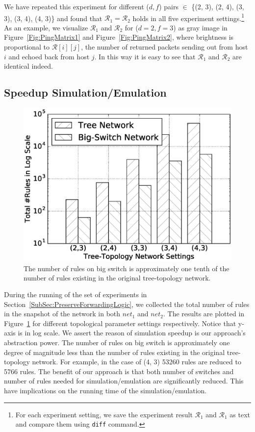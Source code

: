 We have repeated this experiment for different ($d, f$) pairs $\in$
\{(2, 3), (2, 4), (3, 3), (3, 4), (4, 3)\} and found that
$\mathcal{R}_1 = \mathcal{R}_2$ holds in all five experiment settings.\footnote{For each
experiment setting, we save the experiment result $\mathcal{R}_1$ and $\mathcal{R}_1$
as text and compare them using \texttt{diff} command.}
As an example, we visualize $\mathcal{R}_1$ and $\mathcal{R}_2$ for ($d=2, f=3$) as gray image
in Figure~\ref{Fig:PingMatrix1} and Figure~\ref{Fig:PingMatrix2},
where brightness is proportional to $\mathcal{R}[i][j]$,
the number of returned packets sending out from host $i$ and echoed back from host $j$.
In this way it is easy to see that $\mathcal{R}_1$ and $\mathcal{R}_2$ are identical indeed.


\subsection{Speedup Simulation/Emulation}

\begin{figure}[h]
\centering
\includegraphics[scale=.42]{figures/comp_num_rules.eps}
\caption{The number of rules on big switch is approximately one tenth of the
        number of rules existing in the original tree-topology network.}
\label{Fig:CompareNumRules}
\end{figure}

During the running of the set of experiments in Section~\ref{SubSec:PreserveForwardingLogic},
we collected the total number of rules in the snapshot of the network in both $net_1$
and $net_2$.
The results are plotted in Figure~\ref{Fig:CompareNumRules} for different
topological parameter settings respectively.
Notice that y-axis is in log scale.
We assert the reason of simulation speedup is our approach's abstraction power.
The number of rules on big switch is approximately one degree of magnitude less
than the number of rules existing in the original tree-topology network.
For example, in the case of (4, 3) 53260 rules are reduced to 5766 rules.
The benefit of our approach is that both number of switches and number of rules needed
for simulation/emulation are significantly reduced.
This have implications on the running time of the simulation/emulation.

